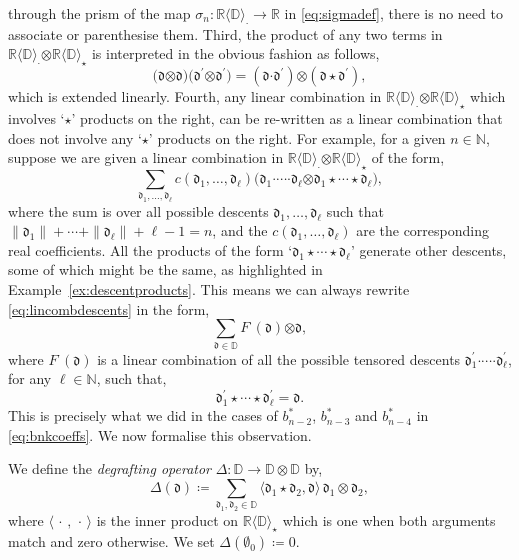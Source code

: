 \documentclass[5p,twocolumn]{elsarticle}
\newcommand*{\R}{\mathbb R}
\newcommand*{\df}{\mathfrak d}
\newcommand*{\cendot}{\boldsymbol{\cdot}}
\newcommand*{\botimes}{\boldsymbol{\otimes}}
\begin{document}
through the prism of the map $\sigma_n\colon\R\langle\mathbb D\rangle_{\cendot}\to\R$ in \eqref{eq:sigmadef}, there is no need to associate or parenthesise them.
Third, the product of any two terms in $\R\langle\mathbb D\rangle_{\cendot}\botimes\R\langle\mathbb D\rangle_{\star}$ is interpreted in the obvious fashion as follows, 
\begin{equation*}
      \bigl(\df\botimes\df\bigr)\bigl(\df^\prime\botimes\df^\prime\bigr)
      =(\df\cendot\df^\prime)\botimes(\df\star\df^\prime),
\end{equation*}
which is extended linearly.
Fourth, any linear combination in $\R\langle\mathbb D\rangle_{\cendot}\botimes\R\langle\mathbb D\rangle_{\star}$ which involves `$\star$' products on the right,
can be re-written as a linear combination that does not involve any `$\star$' products on the right.
For example, for a given $n\in\mathbb N$, suppose we are given a linear combination in $\R\langle\mathbb D\rangle_{\cendot}\botimes\R\langle\mathbb D\rangle_{\star}$ of the form,
\begin{equation}\label{eq:lincombdescents}
    \sum_{\df_1,\ldots,\df_\ell} \!\! c(\df_1,\ldots,\df_\ell)\bigl(\df_1\cendot\cdots\cendot\df_\ell\botimes\df_1\star\cdots\star\df_\ell\bigr),   
\end{equation}
where the sum is over all possible descents $\df_1,\ldots,\df_\ell$ such that $\|\df_1\|+\cdots+\|\df_\ell\|+\ell-1=n$,
and the $c(\df_1,\ldots,\df_\ell)$ are the corresponding real coefficients.
All the products of the form `$\df_1\star\cdots\star\df_\ell$' generate other descents, some of which might be the same, as highlighted in Example~\ref{ex:descentproducts}.
This means we can always rewrite \eqref{eq:lincombdescents} in the form,
\begin{equation}\label{eq:adjoint}
    \sum_{\df\in\mathbb D} F^{\cendot}(\df)\botimes\df,
\end{equation}
where $F^{\cendot}(\df)$ is a linear combination of all the possible tensored descents $\df_1^\prime\cendot\cdots\cendot\df^\prime_\ell$, for any $\ell\in\mathbb N$, such that,
\begin{equation*}
    \df_1^\prime\star\cdots\star\df_\ell^\prime=\df.
\end{equation*}
This is precisely what we did in the cases of $b^\ast_{n-2}$, $b^\ast_{n-3}$ and $b^\ast_{n-4}$ in \eqref{eq:bnkcoeffs}. We now formalise this observation.
%
\begin{definition}[Degrafting]\label{def:degraftingop}
We define the \emph{degrafting operator} $\Delta\colon\mathbb D\to\mathbb D\otimes\mathbb D$ by,
\begin{equation*}
  \Delta(\df)\coloneqq \sum_{\df_1,\df_2\in\mathbb D}\langle \df_1\star \df_2, \df\rangle\,\df_1\otimes\df_2,
\end{equation*}
where $\langle\,\cdot\,,\,\cdot\,\rangle$ is the inner product on $\R\langle\mathbb D\rangle_\star$ which is one when both arguments match and zero otherwise.
We set $\Delta(\emptyset_0)\coloneqq0$.
\end{definition}
\end{document}
